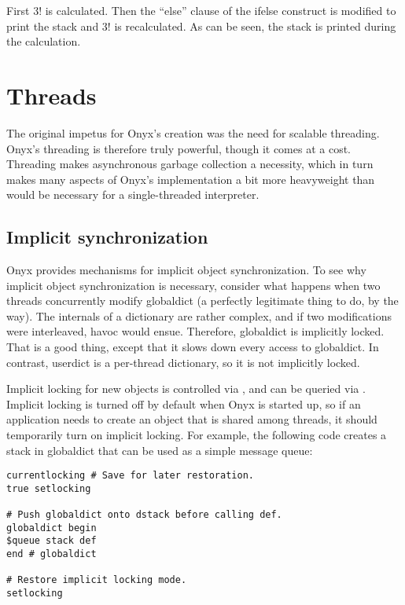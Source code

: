 First $3!$ is calculated.  Then the ``else'' clause of the ifelse construct is
modified to print the stack and $3!$ is recalculated.  As can be seen, the stack
is printed during the calculation.

\section{Threads}

The original impetus for Onyx's creation was the need for scalable threading.
Onyx's threading is therefore truly powerful, though it comes at a cost.
Threading makes asynchronous garbage collection a necessity, which in turn makes
many aspects of Onyx's implementation a bit more heavyweight than would be
necessary for a single-threaded interpreter.

\subsection{Implicit synchronization}

Onyx provides mechanisms for implicit object synchronization.  To see why
implicit object synchronization is necessary, consider what happens when two
threads concurrently modify globaldict (a perfectly legitimate thing to do, by
the way).  The internals of a dictionary are rather complex, and if two
modifications were interleaved, havoc would ensue.  Therefore, globaldict is
implicitly locked.  That is a good thing, except that it slows down every access
to globaldict.  In contrast, userdict is a per-thread dictionary, so it is not
implicitly locked.

Implicit locking for new objects is controlled via
, and can be queried via
.  Implicit
locking is turned off by default when Onyx is started up, so if an application
needs to create an object that is shared among threads, it should temporarily
turn on implicit locking.  For example, the following code creates a stack in
globaldict that can be used as a simple message queue:

\begin{verbatim}
currentlocking # Save for later restoration.
true setlocking

# Push globaldict onto dstack before calling def.
globaldict begin
$queue stack def
end # globaldict

# Restore implicit locking mode.
setlocking
\end{verbatim}

